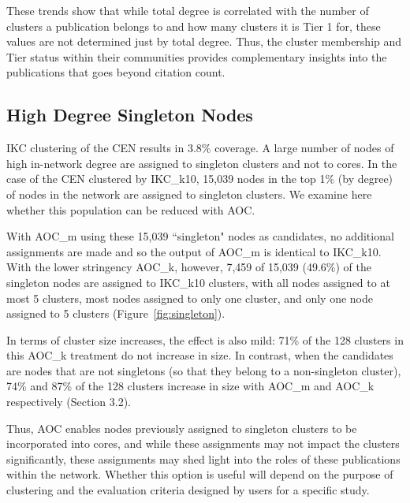 \documentclass[12pt, oneside]{article}   	%
\begin{document}
{These trends show that while total degree is correlated with the number of clusters a publication belongs to and how many clusters it is Tier 1 for,
these values are not determined just by total degree. Thus, the cluster membership and Tier status within their communities provides complementary insights into  the publications that goes beyond citation count.
	
\subsection{High Degree Singleton Nodes} 
	
IKC clustering of the CEN results in 3.8\% coverage. A large number of nodes of high in-network degree are assigned to singleton clusters and not to cores. In the case of the CEN clustered by IKC\_k10, 15,039 nodes in the top 1\% (by degree) of nodes in the network are assigned to singleton clusters. We examine here whether this population can be reduced with AOC. 


With AOC\_m using these 15,039  ``singleton" nodes as candidates, no additional assignments are made and so the output of AOC\_m is identical to IKC\_k10. 
With the lower stringency AOC\_k, however, 7,459 of 15,039 (49.6\%) of the singleton nodes are assigned to IKC\_k10 clusters, with all nodes assigned to at most 5 clusters, most nodes assigned to only one cluster, and only one node assigned to 5 clusters (Figure~\ref{fig:singleton}). 

In terms of cluster size increases, the effect is also mild: 71\% of the 128 clusters in this AOC\_k treatment do not increase in size. 
In contrast, when the candidates are nodes that are not singletons (so that they belong to a non-singleton cluster), 74\% and 87\% of the 128 clusters increase in size with AOC\_m and AOC\_k respectively  (Section 3.2).  

Thus, AOC enables nodes previously assigned to singleton clusters to  be incorporated into cores, and while these assignments may not impact the clusters significantly, these assignments may shed light into the roles of these publications within the network.  
Whether this option is useful will depend on the purpose of clustering and the evaluation criteria designed by users for a specific study.

}
\end{document}
